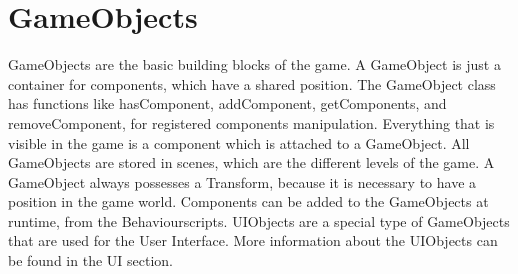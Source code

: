 \section{GameObjects}
\label{sec:gameObjects}
GameObjects are the basic building blocks of the game.
A GameObject is just a container for components, which have a shared position.
The GameObject class has functions like hasComponent, addComponent, getComponents, and removeComponent, for registered components manipulation.
Everything that is visible in the game is a component which is attached to a GameObject.
All GameObjects are stored in scenes, which are the different levels of the game.
A GameObject always possesses a Transform, because it is necessary to have a position in the game world.
Components can be added to the GameObjects at runtime, from the Behaviourscripts.
UIObjects are a special type of GameObjects that are used for the User Interface.
More information about the UIObjects can be found in the UI section.
